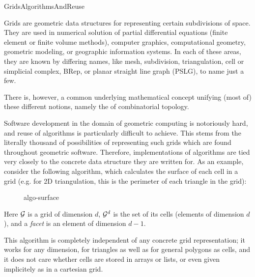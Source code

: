   \begin{Label}{GridsAlgorithmsAndReuse}
  \end{Label}

  Grids are geometric data structures for representing certain subdivisions of space.
  They are used in numerical solution of partial differential equations
  (finite element or finite volume methods),
  computer graphics, computational geometry, geometric modeling, 
  or geographic information systems.
  In each of these areas, they are known by differing names,
  like mesh, subdivision, triangulation, cell or simplicial complex, 
  BRep, or planar straight line graph (PSLG), to name just a few.

  There is, however, a common underlying mathematical concept unifying (most of)
  these different notions, namely the 
  of combinatorial topology.

  Software development in the domain of geometric computing is 
  notoriously hard, 
  and reuse of algorithms is particularly difficult to achieve.
  This stems from the literally thousand of possibilities of
  representing such grids which are found throughout geometric software.
  Therefore, implementations of algorithms are tied very closely to the
  concrete data structure they are written for.
  As an example, consider the following algorithm,
  which calculates the surface of each cell in a grid 
  (e.g. for 2D triangulation, this is the perimeter of each triangle in the grid):

   \begin{figure}[h]
     \begin{center}
       \begin{Label}{algo-surface}
       \T
       \W{}
        \end{Label}
     \end{center}
   \end{figure}

  Here ${\cal G}$ is a grid of dimension $d$, ${\cal G}^d$ is the set of its cells
  (elements of dimension $d$), and a \emph{facet} is an element of dimension $d-1$.

  This algorithm is completely independent of any concrete grid representation;
  it works for any dimension, for triangles as well as for general polygons as cells,
  and it does not care whether cells are stored in arrays or lists, or even given
  implicitely as in a cartesian grid.


